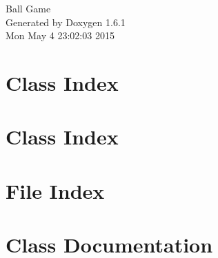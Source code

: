 \documentclass[a4paper]{book}
\begin{document}
\hypersetup{pageanchor=false}
\begin{titlepage}
\vspace*{7cm}
\begin{center}
{\Large Ball Game }\\
\vspace*{1cm}
{\large Generated by Doxygen 1.6.1}\\
\vspace*{0.5cm}
{\small Mon May 4 23:02:03 2015}\\
\end{center}
\end{titlepage}
\clearemptydoublepage
{}
\tableofcontents
\clearemptydoublepage
{}
\hypersetup{pageanchor=true}
\chapter{Class Index}

\chapter{Class Index}

\chapter{File Index}

\chapter{Class Documentation}




























\end{document}
